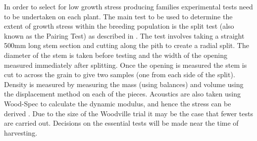 In order to select for low growth stress producing families experimental tests
need to be undertaken on each plant. The main test to be used to determine the
extent of growth stress within the breeding population is the split test (also
known as the Pairing Test) as described in \citet{Chauhan_2010}. The test involves
taking a straight 500mm long stem section and cutting along the pith to create
a radial split. The diameter of the stem is taken before testing and the width
of the opening measured immediately after splitting. Once the opening is
measured the stem is cut to across the grain to give two samples (one from each
side of the split). Density is measured by measuring the mass (using balances)
and volume using the displacement method on each of the pieces. Acoustics are
also taken using Wood-Spec to calculate the dynamic modulus, and hence the
stress can be derived \citep{Chauhan_2010}. Due to the size of the Woodville trial it
may be the case that fewer tests are carried out. Decisions on the essential
tests will be made near the time of harvesting. 
